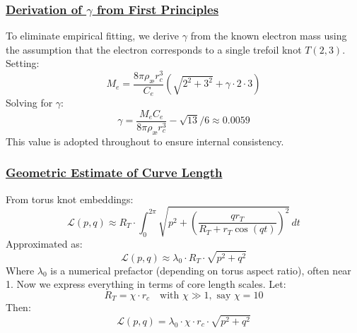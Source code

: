 \documentclass[11pt]{article}
\begin{document}
    \subsubsection*{\textbf{\underline{Derivation of \(\gamma\) from First Principles}}}
    To eliminate empirical fitting, we derive \(\gamma\) from the known electron mass using the assumption that the electron corresponds to a single trefoil knot \(T(2,3)\). Setting:
    \begin{equation}
        M_e = \frac{8\pi \rho_{\text{\ae}} r_c^3}{C_e} \left( \sqrt{2^2 + 3^2} + \gamma \cdot 2 \cdot 3 \right)
    \end{equation}
    Solving for \(\gamma\):
    \begin{equation}
        \gamma = \frac{M_e C_e}{8\pi \rho_{\text{\ae}} r_c^3} - \sqrt{13} \Big/ 6 \approx 0.0059
    \end{equation}
    This value is adopted throughout to ensure internal consistency.

    \subsubsection*{\textbf{\underline{Geometric Estimate of Curve Length}}}
    From torus knot embeddings:
    \begin{equation}
        \mathcal{L}(p, q) \approx R_T \cdot \int_0^{2\pi} \sqrt{p^2 + \left(\frac{q r_T}{R_T + r_T \cos(qt)}\right)^2} \, dt
    \end{equation}
    Approximated as:
    \begin{equation}
        \mathcal{L}(p, q) \approx \lambda_0 \cdot R_T \cdot \sqrt{p^2 + q^2} \tag{2}
    \end{equation}
    Where \(\lambda_0\) is a numerical prefactor (depending on torus aspect ratio), often near 1.
    Now we express everything in terms of core length scales. Let:
    \begin{equation}
        R_T = \chi \cdot r_c \quad \text{with } \chi \gg 1, \text{ say } \chi = 10
    \end{equation}
    Then:
    \begin{equation}
        \mathcal{L}(p, q) = \lambda_0 \cdot \chi \cdot r_c \cdot \sqrt{p^2 + q^2}
    \end{equation}
\end{document}
